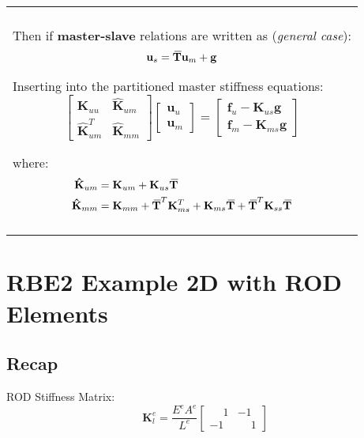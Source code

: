 \documentclass[10pt,b5paper,titlepage]{book}
\newcommand{\m}{\mathbf}
\newcommand{\closure}[2][3]{%
{}\mkern#1mu\overline{\mkern-#1mu#2}}
\newenvironment{bbox}[1][0.96]
{
    \begin{center}
        \begin{tabular}{|p{#1\textwidth}|}
            \hline\\
}
{
            \\\\\hline
        \end{tabular}
    \end{center}
}
\newenvironment{eqarray}
{
    \begin{eqnarray}
        \begin{aligned}
}
{
        \end{aligned}
    \end{eqnarray}
}
\begin{document}
\begin{bbox}

    Then if \textbf{master-slave} relations are written as (\textit{general case}):
    \begin{equation}
        \m{u}_s = \m{\closure{T}} \m{u}_m + \m{g}
    \end{equation}

    Inserting into the partitioned master stiffness equations:
    \begin{equation}
        \begin{bmatrix}
            \m{K}_{uu} & \m{\hat{K}}_{um} \\
            \m{\hat{K}}_{um}^T & \m{\hat{K}}_{mm}
        \end{bmatrix}
        \begin{bmatrix}
            \m{u}_u \\
            \m{u}_m
        \end{bmatrix}
        = \begin{bmatrix}
            \m{f}_u - \m{K}_{us} \m{g} \\
            \m{f}_m - \m{K}_{ms} \m{g}
        \end{bmatrix}
    \end{equation}

    where:
    \begin{eqarray}
        \m{\hat{K}}_{um} &= \m{K}_{um} + \m{K}_{us} \m{\closure{T}} \\
        \m{\hat{K}}_{mm} &= \m{K}_{mm} + \m{\closure{T}}^T \m{K}_{ms}^T
                            + \m{K}_{ms} \m{\closure{T}}
                            + \m{\closure{T}}^T \m{K}_{ss} \m{\closure{T}}
    \end{eqarray}

\end{bbox}


\newpage
\section{RBE2 Example 2D with ROD Elements}

\subsection{Recap}

ROD Stiffness Matrix:
\begin{equation}
    \m{K}_l^e = \frac{E^e A^e}{L^e} \begin{bmatrix}
        \phantom{-}1 & -1 \\
        -1 & \phantom{-}1
    \end{bmatrix}
\end{equation}
\end{document}
